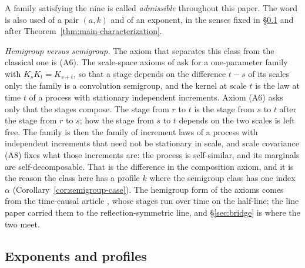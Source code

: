 A family satisfying the nine is called \emph{admissible} throughout this paper. The word is
also used of a pair $(a,k)$ and of an exponent, in the senses fixed in
\S\ref{sec:exponents-recap} and after Theorem~\ref{thm:main-characterization}.

\emph{Hemigroup versus semigroup.} The axiom that separates this class from the classical one
is (A6). The scale-space axioms of  ask for a one-parameter family
with $K_s K_t = K_{s+t}$, so that a stage depends on the difference $t - s$ of its scales
only: the family is a convolution semigroup, and the kernel at scale $t$ is the law at time
$t$ of a process with stationary independent increments. Axiom (A6) asks only that the stages
compose. The stage from $r$ to $t$ is the stage from $s$ to $t$ after the stage from $r$
to $s$; how the stage from $s$ to $t$ depends on the two scales is left free. The family is
then the family of increment laws of a process with independent increments that need not be
stationary in scale, and scale covariance (A8) fixes what those increments are:
the process is self-similar, and its marginals are self-decomposable. That is the difference
in the composition axiom, and it is the reason the class here has a profile $k$
where the semigroup class has one index $\alpha$
(Corollary~\ref{cor:semigroup-case}). The hemigroup form of the axioms comes from the
time-causal article , whose stages run over time on the
half-line; the line paper carried them to the reflection-symmetric line, and
\S\ref{sec:bridge} is where the two meet.

\subsection{Exponents and profiles}\label{sec:exponents-recap}


